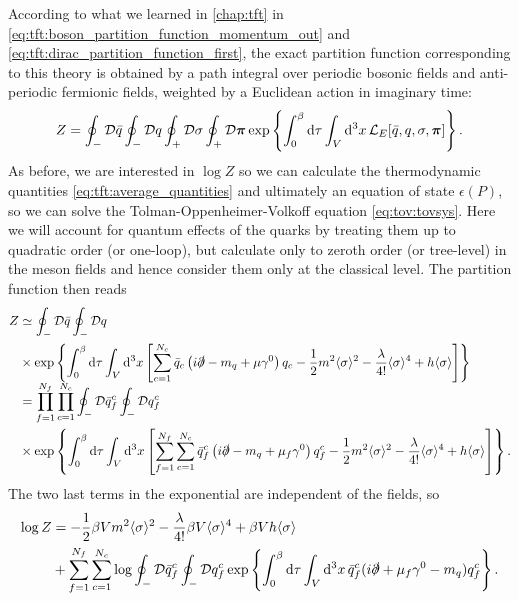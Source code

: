 According to what we learned in \cref{chap:tft} in \cref{eq:tft:boson_partition_function_momentum_out} and \eqref{eq:tft:dirac_partition_function_first},
the exact partition function corresponding to this theory is obtained by a path integral over periodic bosonic fields and anti-periodic fermionic fields, weighted by a Euclidean action in imaginary time:
\begin{equation}
	Z = \oint_- \mathcal{D} \bar{q} \oint_- \mathcal{D} q \oint_+ \mathcal{D} \sigma \oint_+ \mathcal{D} {\bm{\pi}} \exp \left\{ \int_0^\beta \mathop{}\!\mathrm{d} \tau \int_V \mathop{}\!\mathrm{d}^3 x \, \mathcal{L}_E[\bar{q}, q, \sigma, {\bm{\pi}}]  \right\} .
\end{equation}
As before, we are interested in $\log Z$ so we can calculate the thermodynamic quantities \eqref{eq:tft:average_quantities} and ultimately an equation of state $\epsilon(P)$, so we can solve the Tolman-Oppenheimer-Volkoff equation \eqref{eq:tov:tovsys}.
Here we will account for quantum effects of the quarks by treating them up to quadratic order (or one-loop),
but calculate only to zeroth order (or tree-level) in the meson fields and hence consider them only at the classical level.
The partition function then reads
\begin{equation}
\begin{split}
	Z &\simeq \oint_- \mathcal{D} \bar{q} \oint_- \mathcal{D} q \\
	  &\times  \exp \left\{ \int_0^{\beta} \mathop{}\!\mathrm{d} \tau \int_V \mathop{}\!\mathrm{d}^3 x \left[ \sum_{c=1}^{N_c} \bar{q}_c \left( i \slashed\partial -m_q + \mu \gamma^0 \right) q_c - \frac12 m^2 \langle \sigma \rangle^2 - \frac{\lambda}{4!} \langle \sigma \rangle^4 + h \langle \sigma \rangle \right] \right\} \\
	  &=       \prod_{f=1}^{\smash{N_f}} \prod_{c=1}^{\smash{N_c}} \oint_- \mathcal{D} \bar{q}_f^c \oint_- \mathcal{D} q_f^c \\
	  &\times  \exp \left\{ \int_0^{\beta} \mathop{}\!\mathrm{d} \tau \int_V \mathop{}\!\mathrm{d}^3 x \left[ \sum_{f=1}^{\smash{N_f}} \sum_{c=1}^{N_c} \bar{q}_f^c \left( i \slashed\partial - m_q + \mu_f \gamma^0 \right) q_f^c - \frac12 m^2 \langle \sigma \rangle^2 - \frac{\lambda}{4!} \langle \sigma \rangle^4 + h \langle \sigma \rangle \right] \right\}.
\end{split}
\end{equation}
The two last terms in the exponential are independent of the fields, so
\begin{equation}
\begin{split}
	\log Z &= -\frac12 \beta V m^2 \langle \sigma \rangle^2 - \frac{\lambda}{4!} \beta V \langle \sigma \rangle^4 + \beta V h \langle \sigma \rangle \\
	       &+ \sum_{f=1}^{N_f} \sum_{c=1}^{N_c} \log \oint_- \mathcal{D} \bar{q}_f^c \oint_- \mathcal{D} q_f^c \exp \left\{ \int_0^\beta \mathop{}\!\mathrm{d} \tau \int_V \mathop{}\!\mathrm{d}^3 x \, \bar{q}_f^c (i \slashed\partial + \mu_f \gamma^0 - m_q) q_f^c \right\} .
\end{split}
\end{equation}
